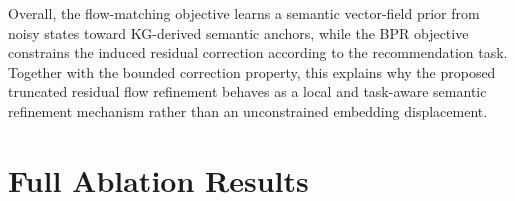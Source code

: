 Overall, the flow-matching objective learns a semantic vector-field prior from noisy states toward KG-derived semantic anchors, while the BPR objective constrains the induced residual correction according to the recommendation task. Together with the bounded correction property, this explains why the proposed truncated residual flow refinement behaves as a local and task-aware semantic refinement mechanism rather than an unconstrained embedding displacement.


\section{Full Ablation Results}
\label{app:full_ablation}

